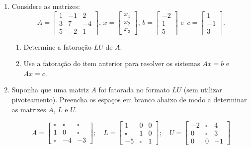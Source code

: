 \documentclass[11pt,a4paper]{article}
\begin{document}
\begin{enumerate}
  \item Considere as matrizes:
$$A=\begin{bmatrix}1 & - 1 & 2 \\ 3 & 7 & -4 \\ 5 & -2 & 1\end{bmatrix}, \, 
x=\begin{bmatrix}x_1 \\ x_2 \\ x_3\end{bmatrix}, \, 
b=\begin{bmatrix}-2 \\ 1 \\ 5\end{bmatrix} \textrm{ e }\,
c=\begin{bmatrix}1 \\ -1 \\ 3\end{bmatrix}. 
$$

  \begin{enumerate}
    \item Determine a fatoração $LU$ de $A$.
    \item Use a fatoração do item anterior para resolver os sistemas $Ax = b$ e $Ax = c$.
  \end{enumerate}

  \item Suponha que uma matriz $A$ foi fatorada no formato $LU$ (sem utilizar pivoteamento). Preencha os espaços em branco abaixo de modo a determinar 
as matrizes $A$, $L$ e $U$.

$$
A=\begin{bmatrix}\square & \square & \square \\ 1 & 0 & \square \\ \square & -4 & -3\end{bmatrix};\quad
L=\begin{bmatrix}1 & 0 & 0 \\ \square & 1 & 0 \\ -5 & \square & 1\end{bmatrix};\quad
U=\begin{bmatrix}-2 & \square & 4 \\ 0 & \square & 3 \\ 0 & 0 & -1\end{bmatrix}
$$

\end{enumerate}
\end{document}
